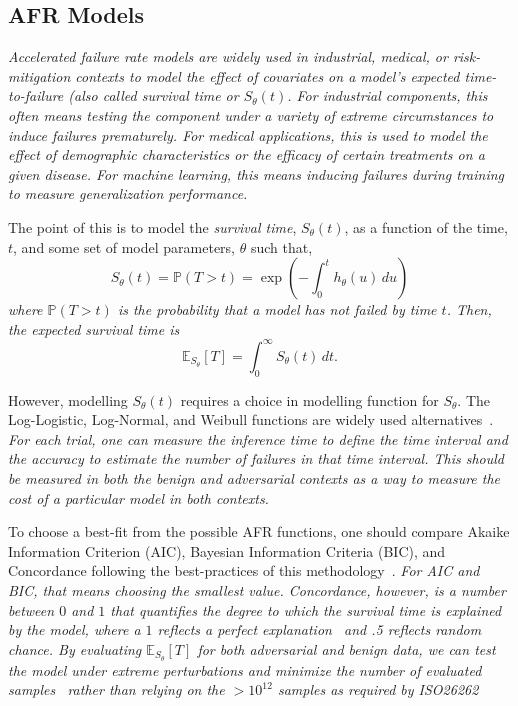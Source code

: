 \documentclass[conference]{IEEEtran}
\newcommand{\cm}[1]{\textit{{\color{blue}#1}}}
\begin{document}
\subsection{AFR Models}
\label{survival_time}
\cm{Accelerated failure rate models are widely used in industrial, medical, or risk-mitigation contexts \cite{kleinbaum1996survival, aft_models} to model the effect of covariates on a model's expected time-to-failure (also called survival time or $S_{\theta}(t)$. For industrial components, this often means testing the component under a variety  of extreme circumstances to induce failures prematurely. For medical applications, this is used to model the effect of demographic characteristics or the efficacy of certain treatments on a given disease. For machine learning, this means inducing failures during training to measure generalization performance.} 

The point of this is to model the \textit{survival time}, $S_{\theta}(t)$, as a function of the time, $t$,  and some set of model parameters, $\theta$ such that,
$$
S_{\theta}(t)= \mathbb{P}(T>t) = \exp\left(-\int_0^t h_{\theta}(u) \, du\right)
$$
\cm{where $\mathbb{P}(T>t)$ is the probability that a model has not failed by time $t$. Then, the expected survival time is}
\[
	\mathbb{E}_{S_\theta}[T] = \int_0^{\infty}  S_\theta(t) \,dt.
\]

However, modelling $S_{\theta}(t)$ requires a choice in modelling function for $S_{\theta}$. The Log-Logistic, Log-Normal, and Weibull functions are widely used alternatives~\cite{kleinbaum1996survival}.  \cm{For each trial, one can measure the inference time to define the time interval and the accuracy to estimate the number of failures in that time interval. This should be measured in both the benign and adversarial contexts as a way to measure the cost of a particular model in both contexts.}

To choose a best-fit from the possible AFR functions, one should compare Akaike Information Criterion (AIC), Bayesian Information Criteria (BIC), and Concordance following the best-practices of this methodology~\cite{aft_models,kleinbaum1996survival}. \cm{For AIC and BIC, that means choosing the smallest value. Concordance, however, is a number between $0$ and $1$ that quantifies the degree to which the survival time is explained by the model, where a $1$ reflects a perfect explanation~\cite{kleinbaum1996survival} and .5 reflects random chance. By evaluating $\mathbb{E}_{S_\theta}[T]$ for both adversarial and benign data, we can test the model under extreme perturbations and minimize the number of evaluated samples~\cite{aft_models,kleinbaum1996survival} rather than relying on the $> 10^{12}$ samples as required by ISO26262~\cite{iso26262}}
\end{document}
